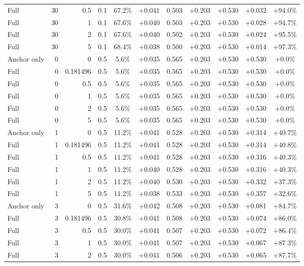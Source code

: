 \begin{table}[htbp]
\begin{tabular}{lrrrccccccc}
Full & 30 & 0.5 & 0.1 & 67.2\% & +0.041 & 0.503 & +0.203 & +0.530 & +0.032 & +94.0\% \\
Full & 30 & 1 & 0.1 & 67.6\% & +0.040 & 0.503 & +0.203 & +0.530 & +0.028 & +94.7\% \\
Full & 30 & 2 & 0.1 & 67.6\% & +0.040 & 0.502 & +0.203 & +0.530 & +0.024 & +95.5\% \\
Full & 30 & 5 & 0.1 & 68.4\% & +0.038 & 0.500 & +0.203 & +0.530 & +0.014 & +97.3\% \\
Anchor only & 0 & 0 & 0.5 & 5.6\% & +0.035 & 0.565 & +0.203 & +0.530 & +0.530 & +0.0\% \\
Full & 0 & 0.181496 & 0.5 & 5.6\% & +0.035 & 0.565 & +0.203 & +0.530 & +0.530 & +0.0\% \\
Full & 0 & 0.5 & 0.5 & 5.6\% & +0.035 & 0.565 & +0.203 & +0.530 & +0.530 & +0.0\% \\
Full & 0 & 1 & 0.5 & 5.6\% & +0.035 & 0.565 & +0.203 & +0.530 & +0.530 & +0.0\% \\
Full & 0 & 2 & 0.5 & 5.6\% & +0.035 & 0.565 & +0.203 & +0.530 & +0.530 & +0.0\% \\
Full & 0 & 5 & 0.5 & 5.6\% & +0.035 & 0.565 & +0.203 & +0.530 & +0.530 & +0.0\% \\
Anchor only & 1 & 0 & 0.5 & 11.2\% & +0.041 & 0.528 & +0.203 & +0.530 & +0.314 & +40.7\% \\
Full & 1 & 0.181496 & 0.5 & 11.2\% & +0.041 & 0.528 & +0.203 & +0.530 & +0.314 & +40.8\% \\
Full & 1 & 0.5 & 0.5 & 11.2\% & +0.041 & 0.528 & +0.203 & +0.530 & +0.316 & +40.3\% \\
Full & 1 & 1 & 0.5 & 11.2\% & +0.040 & 0.528 & +0.203 & +0.530 & +0.316 & +40.3\% \\
Full & 1 & 2 & 0.5 & 11.2\% & +0.040 & 0.530 & +0.203 & +0.530 & +0.332 & +37.3\% \\
Full & 1 & 5 & 0.5 & 11.2\% & +0.038 & 0.533 & +0.203 & +0.530 & +0.357 & +32.6\% \\
Anchor only & 3 & 0 & 0.5 & 31.6\% & +0.042 & 0.508 & +0.203 & +0.530 & +0.081 & +84.7\% \\
Full & 3 & 0.181496 & 0.5 & 30.8\% & +0.041 & 0.508 & +0.203 & +0.530 & +0.074 & +86.0\% \\
Full & 3 & 0.5 & 0.5 & 30.0\% & +0.041 & 0.507 & +0.203 & +0.530 & +0.072 & +86.4\% \\
Full & 3 & 1 & 0.5 & 30.0\% & +0.041 & 0.507 & +0.203 & +0.530 & +0.067 & +87.3\% \\
Full & 3 & 2 & 0.5 & 30.0\% & +0.041 & 0.506 & +0.203 & +0.530 & +0.065 & +87.7\% \\

\end{tabular}
\end{table}
